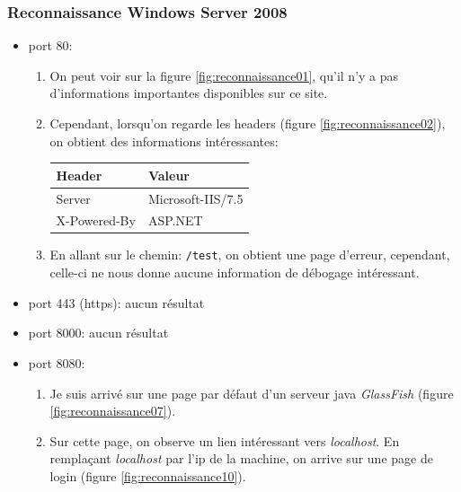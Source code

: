 \documentclass[a4paper]{article}
\begin{document}
\subsubsection{Reconnaissance Windows Server 2008}





\begin{itemize}
    \item port 80:
    \begin{example}
        \begin{enumerate}
            \item On peut voir sur la figure \ref{fig:reconnaissance01}, qu'il n'y a pas d'informations importantes disponibles sur ce site.
            \item Cependant, lorsqu'on regarde les headers (figure \ref{fig:reconnaissance02}), on obtient des informations intéressantes:
            \begin{center}
                \begin{tabular}{|l|l|} \hline
                    \textbf{Header} & \textbf{Valeur} \\ \hline \hline
                    Server & Microsoft-IIS/7.5 \\ \hline
                    X-Powered-By & ASP.NET \\ \hline
                \end{tabular}
            \end{center}
            \item En allant sur le chemin: \texttt{\footnotesize /test}, on obtient une page d'erreur, cependant, celle-ci ne nous donne aucune information de débogage intéressant.
        \end{enumerate}
    \end{example}
    \item port 443 (https): aucun résultat
    \item port 8000: aucun résultat
    \item port 8080:
    \begin{example}
        \begin{enumerate}
            \item Je suis arrivé sur une page par défaut d'un serveur java \textit{GlassFish} (figure \ref{fig:reconnaissance07}).
            \item Sur cette page, on observe un lien intéressant vers \textit{localhost}. En remplaçant \textit{localhost} par l'ip de la machine, on arrive sur une page de login (figure \ref{fig:reconnaissance10}).

\end{enumerate}
\end{example}
\end{itemize}
\end{document}
